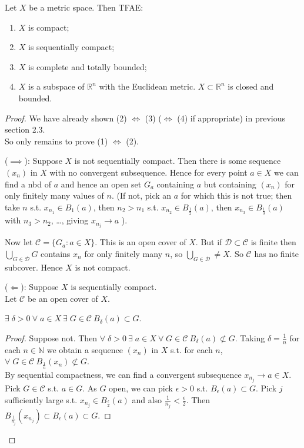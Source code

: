 \begin{theorem}
    Let $X$ be a metric space.
    Then TFAE:
    \begin{enumerate}
        \item $X$ is compact;
        \item $X$ is sequentially compact;
        \item $X$ is complete and totally bounded;
        \item $X$ is a subspace of $\mathbb{R}^n$ with the Euclidean metric. $X \subset \mathbb{R}^n$ is closed and bounded.
    \end{enumerate} 
\end{theorem} 

\begin{proof}
    We have already shown (2) $\iff$ (3) ($\iff$ (4) if appropriate) in previous section 2.3. \\
    So only remains to prove (1) $\iff$ (2).

    ($\implies$): Suppose $X$ is not sequentially compact.
    Then there is some sequence $(x_n)$ in $X$ with no convergent subsequence.
    Hence for every point $a \in X$ we can find a nbd of $a$ and hence an open set $G_a$ containing $a$ but containing $(x_n)$ for only finitely many values of $n$. (If not, pick an $a$ for which this is not true; then take $n$ s.t. $x_{n_1} \in B_1(a)$, then $n_2 > n_1$ s.t. $x_{n_2} \in B_{\frac{1}{2}}(a)$, then $x_{n_3} \in B_{\frac{1}{3}}(a)$ with $n_3 > n_2$, \dots, giving $x_{n_j} \to a$ \Lightning).

    Now let $\mathcal{C} = \{ G_a : a \in X\}$.
    This is an open cover of $X$.
    But if $\mathcal{D} \subset \mathcal{C}$ is finite then $\bigcup_{G \in \mathcal{D}} G$ contains $x_n$ for only finitely many $n$, so $\bigcup_{G \in \mathcal{D}} \neq X$.
    So $\mathcal{C}$ has no finite subcover.
    Hence $X$ is not compact.

    ($\Longleftarrow$): Suppose $X$ is sequentially compact. \\
    Let $\mathcal{C}$ be an open cover of $X$.
    \begin{claim}
        $\exists \; \delta > 0 \ \forall \; a \in X \ \exists \; G \in \mathcal{C} \ B_\delta(a) \subset G$.
    \end{claim} 

    \begin{proof}
        Suppose not.
        Then $\forall \; \delta > 0 \ \exists \;a \in X \ \forall \; G \in \mathcal{C} \ B_\delta(a) \not\subset G$.
        Taking $\delta = \frac{1}{n}$ for each $n \in \mathbb{N}$ we obtain a sequence $(x_n)$ in $X$ s.t. for each $n$, $\forall \; G \in \mathcal{C} \ B_\frac{1}{n}(x_n) \not\subset G$. \\
        By sequential compactness, we can find a convergent subsequence $x_{n_j} \to a \in X$.
        Pick $G \in \mathcal{C}$ s.t. $a \in G$.
        As $G$ open, we can pick $\epsilon > 0$ s.t. $B_\epsilon(a) \subset G$.
        Pick $j$ sufficiently large s.t. $x_{n_j} \in B_{\frac{\epsilon}{2}}(a)$ and also $\frac{1}{n_j} < \frac{\epsilon}{2}$.
        Then $B_{\frac{1}{n_j}}(x_{n_j}) \subset B_\epsilon(a) \subset G$.
    \end{proof} 


\end{proof}
